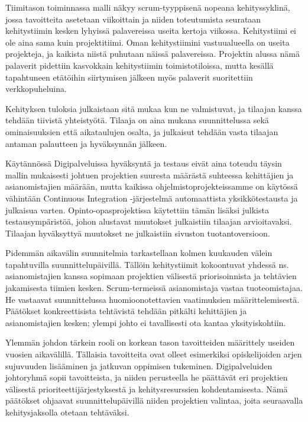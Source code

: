 \documentclass{article}
\begin{document}
Tiimitason toiminnassa malli näkyy scrum-tyyppisenä nopeana kehityssyklinä,
jossa tavoitteita ase\-tetaan viikoittain ja niiden toteutumista seurataan
kehitystiimin kesken lyhyissä palavereissa useita kertoja viikossa.
Kehitystiimi ei ole aina sama kuin projektitiimi. Oman kehitystiimini
vastuualueella on useita projekteja, ja kaikista niistä puhutaan näissä
palavereissa. Projektin alussa nämä palaverit pidettiin kasvokkain kehitystiimin
toimistotiloissa, mutta kesällä tapahtuneen etätöihin siirtymisen jälkeen myös
palaverit suoritettiin verkkopuheluina.

Kehityksen tuloksia julkaistaan sitä mukaa kun ne valmistuvat, ja
tilaajan kanssa tehdään tiivistä yhteis\-työtä. Tilaaja on aina mukana
suunnittelussa sekä ominaisuuksien että aikataulujen osalta, ja julkaisut
tehdään vasta tilaajan antaman palautteen ja hyväksynnän jälkeen.

Käytännössä Digipalveluissa hyväksyntä ja testaus eivät aina toteudu täysin
mallin mukaisesti johtuen projektien suuresta määrästä suhteessa kehittäjien ja
asianomistajien määrään, mutta kaikissa ohjel\-mistoprojekteissamme on käytössä
vähintään Continuous Integration -järjestelmä automaattista yksikkö\-testausta
ja julkaisua varten. Opinto-opasprojektissa käytettiin tämän lisäksi julkista
testausympäristöä, johon alustavat muutokset julkaistiin tilaajan
arvioitavaksi. Tilaajan hyväksyttyä muutokset ne julkaistiin sivuston
tuotantoversioon.

Pidemmän aikavälin suunnitelmia tarkastellaan kolmen kuukauden välein
tapahtuvilla suunnittelu\-päivillä. Tällöin kehitystiimit kokoontuvat yhdessä
ns. asianomistajien kanssa sopimaan projektien välisestä priorisoinnista ja
tehtävien jakamisesta tiimien kesken. Scrum-termeissä asianomistaja vastaa
tuoteomistajaa. He vastaavat suunnittelussa huomioonotettavien vaatimuksien
määrittelemisestä. Päätökset konkreettisista tehtävis\-tä tehdään pitkälti
kehittäjien ja asianomistajien kes\-ken; ylempi johto ei tavallisesti ota
kantaa yksityiskohtiin.

Ylemmän johdon tärkein rooli on korkean tason tavoitteiden määrittely useiden
vuosien aikavälillä. Tällaisia tavoitteita ovat olleet esimerkiksi
opiskelijoiden arjen sujuvuuden lisääminen ja jatkuvan oppimisen tukeminen.
Digipalveluiden johtoryhmä sopii tavoitteista, ja niiden perusteella he
päättävät eri projektien välisestä prioriteetti\-jär\-jes\-tyksestä ja
kehitysresurssien kohdentamisesta. Nämä päätökset ohjaavat suunnittelupäivillä
niiden projektien valintaa, joita seuraavalla kehitysjaksolla otetaan
tehtäväksi.
\end{document}
